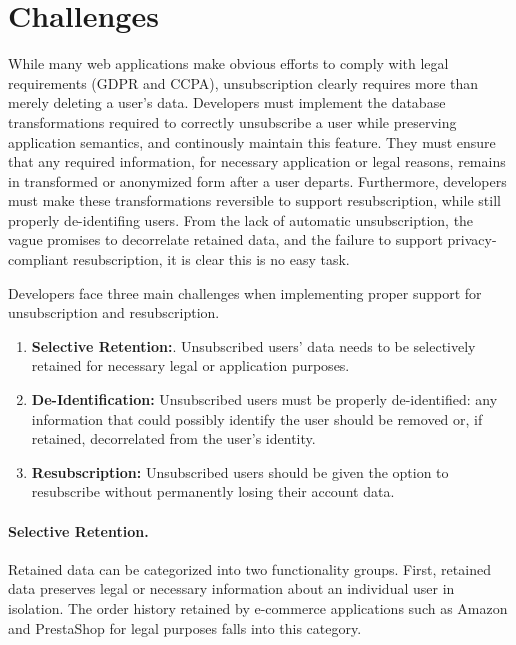 \section{Challenges}
While many web applications make obvious efforts to comply with legal requirements (GDPR and CCPA),
unsubscription clearly requires more than merely deleting a user's data.  
Developers must implement the database transformations required to correctly unsubscribe a user while
preserving application semantics, and continously maintain this feature. 
%
They must ensure that any required information, for necessary application or legal reasons,
remains in transformed or anonymized form after a user departs.
Furthermore, developers must make these transformations reversible to support resubscription,
while still properly de-identifing users.
%
From the lack of automatic unsubscription, the vague promises to decorrelate retained data, and the
failure to support privacy-compliant resubscription, it is clear this is no easy task.
%

Developers face three main challenges when implementing proper support for unsubscription and
resubscription.
\begin{enumerate}
    \item \textbf{Selective Retention:}. Unsubscribed users' data needs to be selectively retained for necessary legal or application purposes.
    \item \textbf{De-Identification:} Unsubscribed users must be properly de-identified: any
        information that could possibly identify the user should be removed or, if retained, decorrelated from the user's identity.
\item \textbf{Resubscription:} Unsubscribed users should be given the option to resubscribe without permanently losing their account
data.
\end{enumerate}

\paragraph{Selective Retention.}
Retained data can be categorized into two functionality groups. First, retained data preserves legal or
necessary information about an individual user in isolation. The order history retained by
e-commerce applications such as Amazon and PrestaShop for legal purposes falls into this category.

